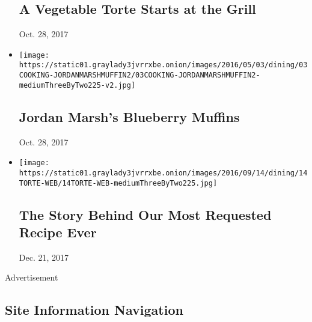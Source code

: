 \begin{itemize}
  \hypertarget{a-vegetable-torte-starts-at-the-grill}{%
  \subsection{A Vegetable Torte Starts at the
  Grill}\label{a-vegetable-torte-starts-at-the-grill}}

  Oct. 28, 2017
\item
  \href{}{}

  \texttt{[image: https://static01.graylady3jvrrxbe.onion/images/2016/05/03/dining/03COOKING-JORDANMARSHMUFFIN2/03COOKING-JORDANMARSHMUFFIN2-mediumThreeByTwo225-v2.jpg]}

  \hypertarget{jordan-marshs-blueberry-muffins}{%
  \subsection{Jordan Marsh's Blueberry
  Muffins}\label{jordan-marshs-blueberry-muffins}}

  Oct. 28, 2017
\item
  \href{https://www.nytimes3xbfgragh.onion/2016/09/14/dining/marian-burros-plum-torte-recipe.html}{}

  \texttt{[image: https://static01.graylady3jvrrxbe.onion/images/2016/09/14/dining/14TORTE-WEB/14TORTE-WEB-mediumThreeByTwo225.jpg]}

  \hypertarget{the-story-behind-our-most-requested-recipe-ever}{%
  \subsection{The Story Behind Our Most Requested Recipe
  Ever}\label{the-story-behind-our-most-requested-recipe-ever}}

  Dec. 21, 2017
\end{itemize}

Advertisement

\hypertarget{site-information-navigation}{%
\subsection{Site Information
Navigation}\label{site-information-navigation}}

